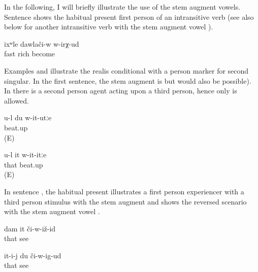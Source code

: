 In the following, I will briefly illustrate the use of the stem augment vowels. Sentence  shows the habitual present first person of an intransitive verb (see also  below for another intransitive verb with the stem augment vowel ).
%
\begin{exe}
	\ex	\label{ex:‎‎‎I become rich fast}
	\gll	ixʷle	dawlači-w	w-irχ-ud\\
		fast	rich	become\\
	\glt	{}
\end{exe}

Examples  and  illustrate the realis conditional with a person marker for second singular. In the first sentence, the stem augment is  but  would also be possible). In  there is a second person agent acting upon a third person, hence only  is allowed. 
%
\begin{exe}
	\ex	\label{ex:if you beat me up}
	\gll	u-l	du	w-it-utːe\\
				beat.up\\
	\glt	{} (E)

	\ex	\label{ex:if you beat him up}
	\gll	u-l	it	w-it-itːe\\
			that	beat.up\\
	\glt	{} (E)
\end{exe}

In sentence , the habitual present illustrates a first person experiencer with a third person stimulus with the stem augment  and  shows the reversed scenario with the stem augment vowel .
%
\begin{exe}
	\ex	\label{ex:habitual present stem augmentation@20}
	\begin{xlist}
		\ex	\label{ex:I will see him@20a}
		\gll	dam	it 	či-w-iž-id\\
				that	see\\
		\glt	{}

		\ex	\label{ex:S/he will see me@20c}
		\gll	it-i-j	du	či-w-ig-ud\\
			that		see\\
		\glt	{}
	\end{xlist}
\end{exe}

